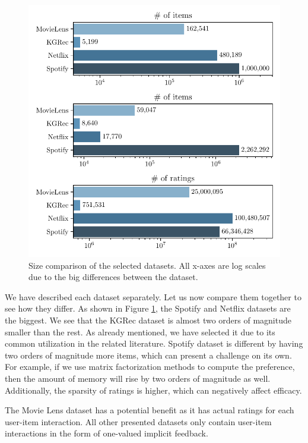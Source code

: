 \begin{figure}[ht!]
    \centering
    \includegraphics{img/figures/datasets_counts.pdf}
    \caption[Size comparison of the selected datasets.]{Size comparison of the selected datasets. All x-axes are log scales due to the big differences between the dataset.}
    \label{fig:datasets_counts}
\end{figure}

We have described each dataset separately. Let us now compare them together to see how they differ. As shown in Figure \ref{fig:datasets_counts}, the Spotify and Netflix datasets are the biggest. We see that the KGRec dataset is almost two orders of magnitude smaller than the rest. As already mentioned, we have selected it due to its common utilization in the related literature. Spotify dataset is different by having two orders of magnitude more items, which can present a challenge on its own. For example, if we use matrix factorization methods to compute the preference, then the amount of memory will rise by two orders of magnitude as well. Additionally, the sparsity of ratings is higher, which can negatively affect efficacy.

The Movie Lens dataset has a potential benefit as it has actual ratings for each user-item interaction. All other presented datasets only contain user-item interactions in the form of one-valued implicit feedback.

